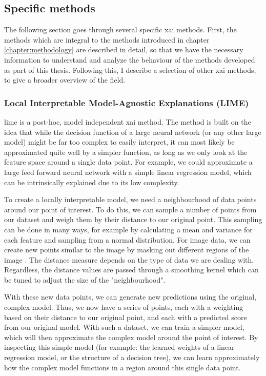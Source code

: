 \documentclass[UKenglish]{uiomasterthesis} %
\theoremstyle{definition}
\begin{document}
\subsection{Specific methods} \label{section:xaimethodsbackground}


The following section goes through several specific \ac{xai} methods. First, the methods which are integral to the methods introduced in chapter \ref{chapter:methodology} are described in detail, so that we have the necessary information to understand and analyze the behaviour of the methods developed as part of this thesis. Following this, I describe a selection of other \ac{xai} methods, to give a broader overview of the field.

\subsubsection{Local Interpretable Model-Agnostic Explanations (LIME)}

\ac{lime} \cite{lime} is a post-hoc, model independent \ac{xai} method. The method is built on the idea that while the decision function of a large neural network (or any other large model) might be far too complex to easily interpret, it can most likely be approximated quite well by a simpler function, as long as we only look at the feature space around a single data point. For example, we could approximate a large feed forward neural network with a simple linear regression model, which can be intrinsically explained due to its low complexity.

To create a locally interpretable model, we need a neighbourhood of data points around our point of interest. To do this, we can sample a number of points from our dataset and weigh them by their distance to our original point. This sampling can be done in many ways, for example by calculating a mean and variance for each feature and sampling from a normal distribution. For image data, we can create new points similar to the image by masking out different regions of the image \cite{molnar}. The distance measure depends on the type of data we are dealing with. Regardless, the distance values are passed through a smoothing kernel which can be tuned to adjust the size of the "neighbourhood".

With these new data points, we can generate new predictions using the original, complex model. Thus, we now have a series of points, each with a weighting based on their distance to our original point, and each with a predicted score from our original model. With such a dataset, we can train a simpler model, which will then approximate the complex model around the point of interest. By inspecting this simple model (for example: the learned weights of a linear regression model, or the structure of a decision tree), we can learn approximately how the complex model functions in a region around this single data point.
\end{document}

